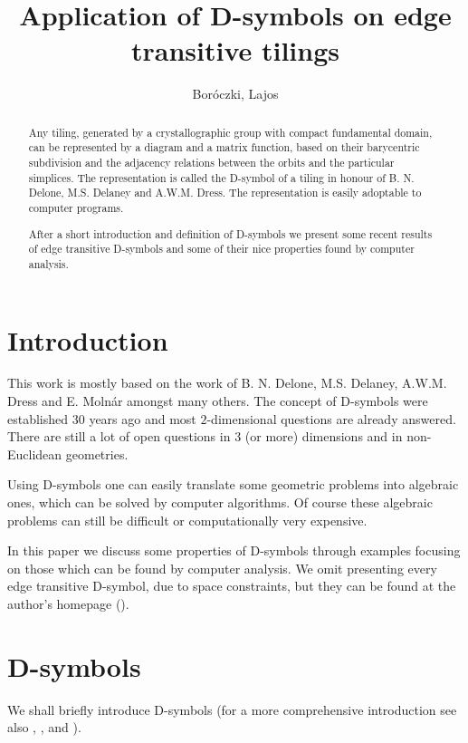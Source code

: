 \documentclass[12pt,a4paper]{article}
\numberwithin{equation}{section}
\theoremstyle{plain}%
\theoremstyle{definition}
\theoremstyle{remark}
\begin{document}
\title{Application of D-symbols on edge transitive tilings}
\author{Boróczki, Lajos}
\maketitle

\begin{abstract}
  Any tiling, generated by a crystallographic group with compact fundamental
  domain, can be represented by a diagram and a matrix function, based on
  their barycentric subdivision and the adjacency relations between the orbits
  and the particular simplices. The representation is called the D-symbol of a
  tiling in honour of B. N. Delone, M.S. Delaney and A.W.M. Dress. The
  representation is easily adoptable to computer programs.

  After a short introduction and definition of D-symbols we 
  present some recent results of edge transitive D-symbols and some of their
  nice properties found by computer analysis.
\end{abstract}

\section{Introduction}
This work is mostly based on the work of B. N. Delone, M.S. Delaney,
A.W.M. Dress and E. Molnár amongst many others. The concept of D-symbols were
established $30$ years ago and most $2$-dimensional questions are already
answered. There are still a lot of open questions in $3$ (or more) dimensions
and in non-Euclidean geometries.

Using D-symbols one can easily translate some geometric problems into algebraic
ones, which can be solved by computer algorithms. Of course these algebraic
problems can still be difficult or computationally very expensive.

In this paper we discuss some properties of D-symbols through examples focusing
on those which can be found by computer analysis. We omit presenting every edge
transitive D-symbol, due to space constraints, but they can be found at the
author's homepage (\cite{MYHOME_edge_trans}).

\section{D-symbols}
We shall briefly introduce D-symbols (for a more comprehensive introduction see
also \cite{BSzK02}, \cite{DHM93}, \cite{M96} and \cite{M11}). 
\end{document}
